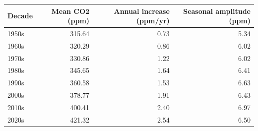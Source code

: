 
\begin{tabular}[t]{lrrr}
\toprule
Decade & Mean CO2 (ppm) & Annual increase (ppm/yr) & Seasonal amplitude (ppm)\\
\midrule
1950s & 315.64 & 0.73 & 5.34\\
1960s & 320.29 & 0.86 & 6.02\\
1970s & 330.86 & 1.22 & 6.02\\
1980s & 345.65 & 1.64 & 6.41\\
1990s & 360.58 & 1.53 & 6.63\\
2000s & 378.77 & 1.91 & 6.43\\
2010s & 400.41 & 2.40 & 6.97\\
2020s & 421.32 & 2.54 & 6.50\\
\bottomrule
\end{tabular}
